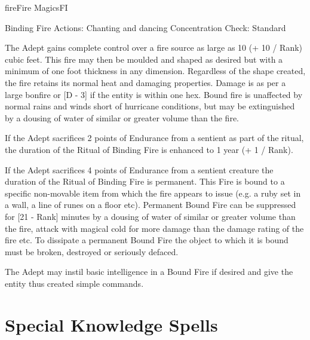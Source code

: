 \begin{College}[2.0]{fire}{Fire Magics}{FI}
\begin{ritual}[Q-1]{Binding Fire}
Actions: Chanting and dancing 
Concentration Check: Standard 
\begin{effects}
The Adept gains complete control over a fire source as large as 10 (+
10 / Rank) cubic feet.  This fire may then be moulded and shaped as
desired but with a minimum of one foot thickness in any dimension.
Regardless of the shape created, the fire retains its normal heat and
damaging properties. Damage is as per a large bonfire or [D - 3] if
the entity is within one hex.  Bound fire is unaffected by normal
rains and winds short of hurricane conditions, but may be extinguished
by a dousing of water of similar or greater volume than the fire.

If the Adept sacrifices 2 points of Endurance from a sentient as part
of the ritual, the duration of the Ritual of Binding Fire is enhanced
to 1 year (+ 1 / Rank).

If the Adept sacrifices 4 points of Endurance from a sentient creature
the duration of the Ritual of Binding Fire is permanent. This Fire is
bound to a specific non-movable item from which the fire appears to
issue (e.g. a ruby set in a wall, a line of runes on a floor etc).
Permanent Bound Fire can be suppressed for [21 - Rank] minutes by a
dousing of water of similar or greater volume than the fire, attack
with magical cold for more damage than the damage rating of the fire
etc. To dissipate a permanent Bound Fire the object to which it is
bound must be broken, destroyed or seriously defaced.

The Adept may instil basic intelligence in a Bound Fire if desired and
give the entity thus created simple commands.
\end{effects}
\end{ritual}


\section{Special Knowledge Spells}


\end{College}
